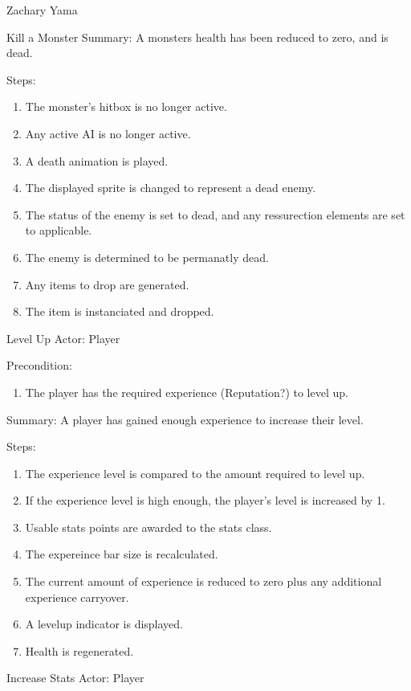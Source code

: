 \documentclass[12pt]{report}
\begin{document}
\begin{section}{Zachary Yama}
\begin{subsection}{Kill a Monster}
Summary: A monsters health has been reduced to zero, and is dead.

Steps:
\begin{enumerate}
\item The monster's hitbox is no longer active.
\item Any active AI is no longer active.
\item A death animation is played.
\item The displayed sprite is changed to represent a dead enemy.
\item The status of the enemy is set to dead, and any ressurection elements
are set to applicable.
\item The enemy is determined to be permanatly dead.
\item Any items to drop are generated.
\item The item is instanciated and dropped.
\end{enumerate}
\end{subsection}

\begin{subsection}{Level Up}
Actor: Player

Precondition:
\begin{enumerate}
\item The player has the required experience (Reputation?) to level up.
\end{enumerate}

Summary: A player has gained enough experience to increase their level. 

Steps:
\begin{enumerate}
\item The experience level is compared to the amount required to level up. 
\item If the experience level is high enough, the player's level is
increased by 1.
\item Usable stats points are awarded to the stats class. 
\item The expereince bar size is recalculated.
\item The current amount of experience is reduced to zero plus any
additional experience carryover.
\item A levelup indicator is displayed.
\item Health is regenerated.
\end{enumerate}
\end{subsection}

\begin{subsection}{Increase Stats}
Actor: Player


\end{subsection}
\end{section}
\end{document}
